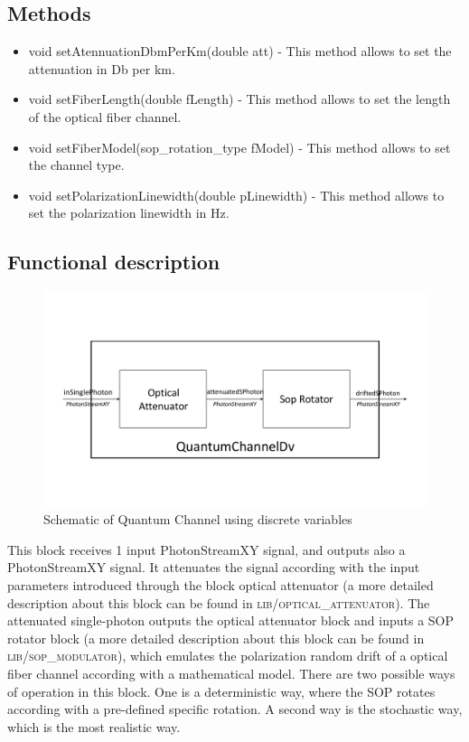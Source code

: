 \subsection*{Methods}
\begin{itemize}
        \item void setAtennuationDbmPerKm(double att) - This method allows to set the attenuation in Db per km.

        \item void setFiberLength(double fLength) - This method allows to set the length of the optical fiber channel.

		\item void setFiberModel(sop\_rotation\_type fModel) - This method allows to set the channel type.
	
		\item void setPolarizationLinewidth(double pLinewidth) - This method allows to set the polarization linewidth in Hz.
	\end{itemize}

\subsection*{Functional description}

\begin{figure}[h]
	\centering
	\includegraphics[clip, trim=0.5cm 2.0cm 0.5cm 2cm, width=1.0\textwidth]{./lib/QuantumChannelDv/figures/QuantumChannelDv_diagram.pdf}
	\caption{Schematic of Quantum Channel using discrete variables}\label{QuantumChannelDvDiagram}
\end{figure}

This block receives 1 input PhotonStreamXY signal, and outputs also a PhotonStreamXY signal. It attenuates the signal according with the input parameters introduced through the block optical attenuator (a more detailed description about this block can be found in \textsc{lib/optical\_attenuator}). The attenuated single-photon outputs the optical attenuator block and inputs a SOP rotator block (a more detailed description about this block can be found in \textsc{lib/sop\_modulator}), which emulates the polarization random drift of a optical fiber channel according with a mathematical model. There are two possible ways of operation in this block. One is a deterministic way, where the SOP rotates according with a pre-defined specific rotation. A second way is the stochastic way, which is the most realistic way.



